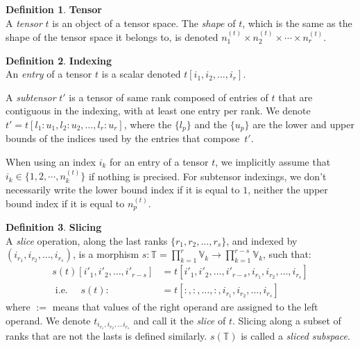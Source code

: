 \documentclass{article}
\theoremstyle{definition}
\newtheorem{definition}{Definition}[section]
\theoremstyle{remark}
\theoremstyle{plain}
\newcommand{\tspace}{\mathbb{T}}
\newcommand{\vecspace}{\mathbb{V}}
\begin{document}
\begin{definition}\textbf{Tensor}\\
A \emph{tensor} $t$ is an object of a tensor space. The \emph{shape} of $t$, which is the same as the shape of the tensor space it belongs to, is denoted $n_1^{(t)} \times n_2^{(t)} \times \cdots \times n_r^{(t)}$.
\end{definition}

\begin{definition}\textbf{Indexing}\\
An \emph{entry} of a tensor $t$ is a scalar denoted $t[i_1, i_2, \ldots, i_r]$.

A \emph{subtensor} $t'$ is a tensor of same rank composed of entries of $t$ that are contiguous in the indexing, with at least one entry per rank. We denote $t' = t[l_1{:}u_1, l_2{:}u_2, \ldots, l_r{:}u_r]$, where the $\{l_p\}$ and the $\{u_p\}$ are the lower and upper bounds of the indices used by the entries that compose~$t'$.
\end{definition}

When using an index $i_k$ for an entry of a tensor $t$, we implicitly assume that $i_k \in \{1, 2, \cdots, n_k^{(t)}\}$ if nothing is precised.
For subtensor indexings, we don't necessarily write the lower bound index if it is equal to $1$, neither the upper bound index if it is equal to $n_p^{(t)}$.

\begin{definition}\textbf{Slicing}\\
A \emph{slice} operation, along the last ranks $\{r_1, r_2, \ldots, r_s\}$, and indexed by $(i_{r_1}, i_{r_2}, \ldots, i_{r_s})$, is a morphism $s: \tspace = \displaystyle \prod_{k=1}^r \vecspace_k \rightarrow \prod_{k=1}^{r-s} \vecspace_k$, such that:
\begin{align*}
s(t)[i'_1, i'_2, \ldots, i'_{r-s}] &= t[i'_1, i'_2, \ldots, i'_{r-s}, i_{r_1}, i_{r_2}, \ldots, i_{r_s}] \\
\text{ i.e. } \quad s(t) :&= t[:,:, \ldots, :, i_{r_1}, i_{r_2}, \ldots, i_{r_s}]
\end{align*}
where $:=$ means that values of the right operand are assigned to the left operand.
We denote $t_{i_{r_1}, i_{r_2}, \ldots i_{r_s}}$ and call it the \emph{slice} of $t$. 
Slicing along a subset of ranks that are not the lasts is defined similarly.
$s(\tspace)$ is called a \emph{sliced subspace}.
\end{definition}
\end{document}
